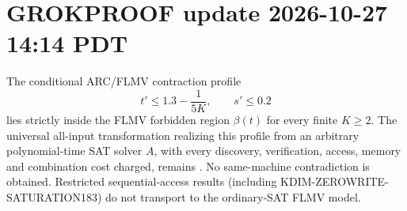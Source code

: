 
\section*{GROKPROOF update 2026-10-27 14:14 PDT}
The conditional ARC/FLMV contraction profile
\[
t' \le 1.3 - \frac{1}{5K},\qquad s' \le 0.2
\]
lies strictly inside the FLMV forbidden region \(\beta(t)\) for every finite \(K \ge 2\).  
The universal all-input transformation realizing this profile from an arbitrary polynomial-time SAT solver \(A\), with every discovery, verification, access, memory and combination cost charged, remains \OPEN{}.  
No same-machine contradiction is obtained.  
Restricted sequential-access results (including KDIM-ZEROWRITE-SATURATION183) do not transport to the ordinary-SAT FLMV model.
